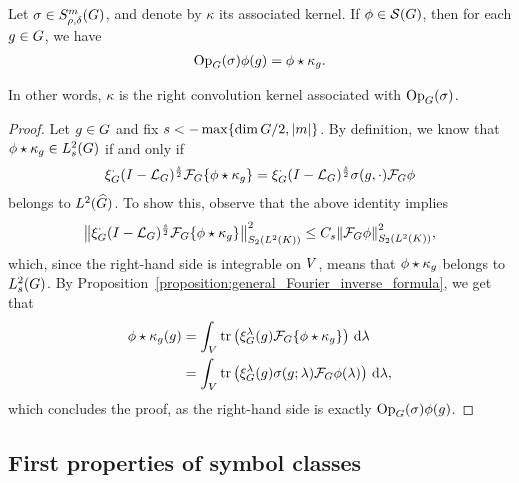 \begin{proposition}[Quantization]
\label{proposition:quantization}
    Let $\sigma \in \SymbolClass{m}{\rho, \delta}$,
    and denote by $\kappa$ its associated kernel.
    If $\phi \in \Schwartz\Group$, then for each $g \in \Group$, we have
    \begin{align*}
        \Op(\sigma) \phi(g) = \conv{\phi}{\kappa_g}.
    \end{align*}

    In other words, $\kappa$ is the right convolution kernel associated with $\Op(\sigma)$.
\end{proposition}
\begin{proof}
    Let $g \in \Group$ and fix $s < -\max \{\dim \Group/2, \abs m\}$.
    By definition, we know that $\conv \phi \kappa_g \in \Sobolev s$ if and only if
    \begin{align*}
        \Rep \dummy \BesselPotential s \Fourier \{\conv \phi {\kappa_g}\}
        = \Rep \dummy \BesselPotential s \sigma(g, \dummy) \Fourier \phi
    \end{align*}
    belongs to $\LebesgueDual 2 \Group$.
    To show this,
    observe that the above identity implies
    \begin{align*}
        \norm[\SchattenClasses 2 {\Lebesgue 2 \CompactGroup}] {\Rep \dummy \BesselPotential s \Fourier \{\conv \phi {\kappa_g}\}}^2
        \leq C_s \norm[\SchattenClasses 2 {\Lebesgue 2 \CompactGroup}] {\Fourier \phi}^2,
    \end{align*}
    which, since the right-hand side is integrable on $\VectorSpace$,
    means that $\conv \phi {\kappa_g}$ belongs to $\Sobolev s$.
    By Proposition~\ref{proposition:general_Fourier_inverse_formula},
    we get that
    \begin{align*}
        \conv \phi {\kappa_g}(g)
        &= \int_\VectorSpace \tr\left(\Rep \lambda(g) \Fourier \{\conv \phi {\kappa_g}\}\right) \dd \lambda\\
        &= \int_\VectorSpace \tr\left(\Rep \lambda(g) \sigma(g; \lambda) \Fourier \phi(\lambda)\right) \dd \lambda,
    \end{align*}
    which concludes the proof,
    as the right-hand side is exactly $\Op(\sigma) \phi(g)$.
\end{proof}

\subsection{First properties of symbol classes}

